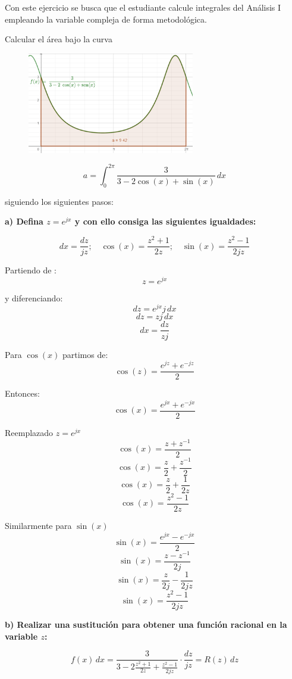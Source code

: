 \documentclass[12pt,a4paper]{report}
\begin{document}
Con este ejercicio se busca que el estudiante calcule integrales del Análisis I empleando la variable
compleja de forma metodológica.

Calcular el área bajo la curva\\


\begin{figure}[h] %
    \centering %
    \includegraphics[width=0.65\textwidth]{./Imagenes/foto1Ej7.png} %
\end{figure}

$$a = \int_{0}^{2\pi} \frac{3}{3 - 2\cos(x) + \sin(x)} \, dx$$

siguiendo los siguientes pasos:

\textbf{a)  Defina $z = e^{jx}$ y con ello consiga las siguientes igualdades:}

$$dx = \frac{dz}{jz}; \quad \cos(x) = \frac{z^{2} + 1}{2z}; \quad \sin(x) = \frac{z^{2} - 1}{2jz}$$

Partiendo de :
$$z = e^{jx}$$

y diferenciando:
$$dz = e^{jx}j \, dx$$
$$dz = zj \, dx$$
$$dx = \frac{dz}{zj}$$

Para $\cos(x)$ partimos de:
$$\cos(z)=\frac{e^{jz}+e^{-jz}}{2}$$

Entonces:
$$\cos(x)=\frac{e^{jx}+e^{-jx}}{2}$$

Reemplazado $z=e^{jx}$
$$\cos(x)=\frac{z+z^{-1}}{2}$$
$$\cos(x)=\frac{z}{2}+\frac{z^{-1}}{2}$$
$$\cos(x)=\frac{z}{2}+\frac{1}{2z}$$
$$\cos(x)=\frac{z^2-1}{2z}$$

Similarmente para $\sin(x)$
$$\sin(x)=\frac{e^{jx}-e^{-jx}}{2}$$
$$\sin(x)=\frac{z-z^{-1}}{2j}$$
$$\sin(x)=\frac{z}{2j}-\frac{1}{2jz}$$
$$\sin(x)=\frac{z^2-1}{2jz}$$

\textbf{b)  Realizar una sustitución para obtener una función racional en la variable $z$:}

$$ f(x) \, dx = \frac{3}{3 - 2\frac{z^{2} + 1}{2z} + \frac{z^{2} - 1}{2jz}} \cdot \frac{dz}{jz} = R(z) \, dz $$ 
\end{document}
